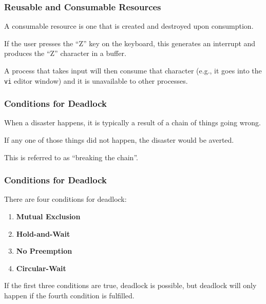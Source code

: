 \begin{frame}
\frametitle{Reusable and Consumable Resources}

A consumable resource is one that is created and destroyed upon consumption. 

If the user presses the ``Z'' key on the keyboard, this generates an interrupt and produces the ``Z'' character in a buffer. 

A process that takes input will then consume that character (e.g., it goes into the \texttt{vi} editor window) and it is unavailable to other processes.

\end{frame}

\begin{frame}
\frametitle{Conditions for Deadlock}

When a disaster happens, it is typically a result of a chain of things going wrong. 

If any one of those things did not happen, the disaster would be averted. 

This is referred to as ``breaking the chain''.

\end{frame}

\begin{frame}
\frametitle{Conditions for Deadlock}
There are four conditions for deadlock:

\begin{enumerate}
	\item \textbf{Mutual Exclusion}
	\item \textbf{Hold-and-Wait}
	\item \textbf{No Preemption}
	\item \textbf{Circular-Wait}
\end{enumerate}


If the first three conditions are true, deadlock is possible, but deadlock will only happen if the fourth condition is fulfilled. 


\end{frame}

